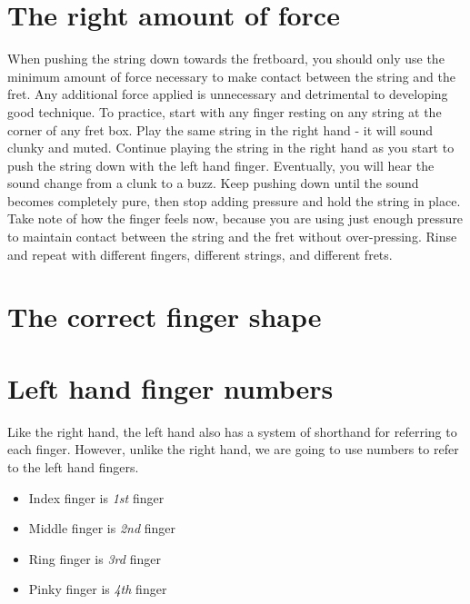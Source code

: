 
\section{The right amount of force}

When pushing the string down towards the fretboard, you should only use the minimum amount of force necessary to make contact between the string and the fret. Any additional force applied is unnecessary and detrimental to developing good technique. To practice, start with any finger resting on any string at the corner of any fret box. Play the same string in the right hand - it will sound clunky and muted. Continue playing the string in the right hand as you start to push the string down with the left hand finger. Eventually, you will hear the sound change from a clunk to a buzz. Keep pushing down until the sound becomes completely pure, then stop adding pressure and hold the string in place. Take note of how the finger feels now, because you are using just enough pressure to maintain contact between the string and the fret without over-pressing. Rinse and repeat with different fingers, different strings, and different frets. 

\section{The correct finger shape}


\section{Left hand finger numbers}

Like the right hand, the left hand also has a system of shorthand for referring to each finger. However, unlike the right hand, we are going to use numbers to refer to the left hand fingers. 

\begin{itemize}
	\item Index finger is \textit{1st} finger
	\item Middle finger is \textit{2nd} finger
	\item Ring finger is \textit{3rd} finger
	\item Pinky finger is \textit{4th} finger 
\end{itemize}

